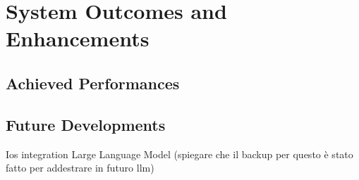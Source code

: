 \section{System Outcomes and Enhancements}

\subsection{Achieved Performances}

\subsection{Future Developments}
Ios integration
Large Language Model (spiegare che il backup per questo è stato fatto per addestrare in futuro llm)